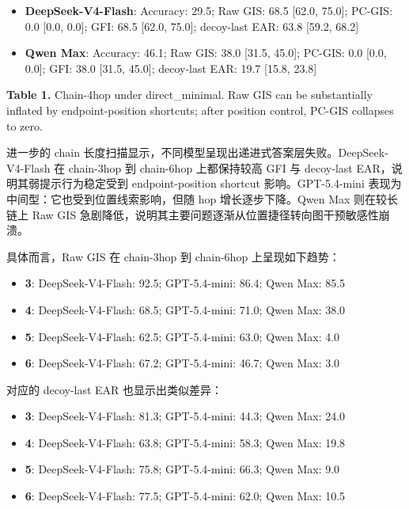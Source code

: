 \documentclass[
  11pt,
]{article}
\providecommand{\tightlist}{%
  \setlength{\itemsep}{0pt}\setlength{\parskip}{0pt}}
\begin{document}
\begin{itemize}
\tightlist
\item
  \textbf{DeepSeek-V4-Flash}: Accuracy: 29.5; Raw GIS: 68.5 {[}62.0,
  75.0{]}; PC-GIS: 0.0 {[}0.0, 0.0{]}; GFI: 68.5 {[}62.0, 75.0{]};
  decoy-last EAR: 63.8 {[}59.2, 68.2{]}
\item
  \textbf{Qwen Max}: Accuracy: 46.1; Raw GIS: 38.0 {[}31.5, 45.0{]};
  PC-GIS: 0.0 {[}0.0, 0.0{]}; GFI: 38.0 {[}31.5, 45.0{]}; decoy-last
  EAR: 19.7 {[}15.8, 23.8{]}
\end{itemize}

\textbf{Table 1.} Chain-4hop under direct\_minimal. Raw GIS can be
substantially inflated by endpoint-position shortcuts; after position
control, PC-GIS collapses to zero.

进一步的 chain
长度扫描显示，不同模型呈现出递进式答案层失败。DeepSeek-V4-Flash 在
chain-3hop 到 chain-6hop 上都保持较高 GFI 与 decoy-last
EAR，说明其弱提示行为稳定受到 endpoint-position shortcut
影响。GPT-5.4-mini 表现为中间型：它也受到位置线索影响，但随 hop
增长逐步下降。Qwen Max 则在较长链上 Raw GIS
急剧降低，说明其主要问题逐渐从位置捷径转向图干预敏感性崩溃。

具体而言，Raw GIS 在 chain-3hop 到 chain-6hop 上呈现如下趋势：

\begin{itemize}
\tightlist
\item
  \textbf{3}: DeepSeek-V4-Flash: 92.5; GPT-5.4-mini: 86.4; Qwen Max:
  85.5
\item
  \textbf{4}: DeepSeek-V4-Flash: 68.5; GPT-5.4-mini: 71.0; Qwen Max:
  38.0
\item
  \textbf{5}: DeepSeek-V4-Flash: 62.5; GPT-5.4-mini: 63.0; Qwen Max: 4.0
\item
  \textbf{6}: DeepSeek-V4-Flash: 67.2; GPT-5.4-mini: 46.7; Qwen Max: 3.0
\end{itemize}

对应的 decoy-last EAR 也显示出类似差异：

\begin{itemize}
\tightlist
\item
  \textbf{3}: DeepSeek-V4-Flash: 81.3; GPT-5.4-mini: 44.3; Qwen Max:
  24.0
\item
  \textbf{4}: DeepSeek-V4-Flash: 63.8; GPT-5.4-mini: 58.3; Qwen Max:
  19.8
\item
  \textbf{5}: DeepSeek-V4-Flash: 75.8; GPT-5.4-mini: 66.3; Qwen Max: 9.0
\item
  \textbf{6}: DeepSeek-V4-Flash: 77.5; GPT-5.4-mini: 62.0; Qwen Max:
  10.5
\end{itemize}
\end{document}
